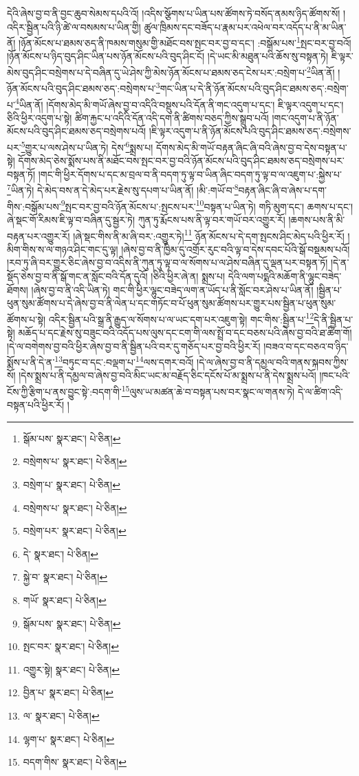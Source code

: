 དེའི་ཞེས་བྱ་བ་ནི་བྱང་ཆུབ་སེམས་དཔའི་འོ། །འདིས་སྩོགས་པ་ཡིན་པས་ཚོགས་ཏེ་བསོད་ནམས་ཉིད་ཚོགས་སོ། །འདིར་སྦྱིན་པའི་ཉི་ཚེ་ལ་བསམས་པ་ཡིན་གྱི། ཚུལ་ཁྲིམས་དང་བཟོད་པ་རྣམ་པར་འཕེལ་བར་འདོད་པ་ནི་མ་ཡིན་ནོ། །ཉོན་མོངས་པ་ཐམས་ཅད་ནི་ཁམས་གསུམ་གྱི་མཐོང་བས་སྤང་བར་བྱ་བ་དང་། :བསྒོམ་པས་\footnote{སྒོམ་པས་  སྣར་ཐང་།  པེ་ཅིན། }སྤང་བར་བྱ་བའོ། །ཉོན་མོངས་པ་ཉིད་བུད་ཤིང་ཡིན་པས་ཉོན་མོངས་པའི་བུད་ཤིང་ངོ། །དེ་ཡང་མི་མཐུན་པའི་ཆོས་སུ་བསྟན་ཏེ། ཇི་ལྟར་མེས་བུད་ཤིང་བསྲེགས་པ་དེ་བཞིན་དུ་ཡེ་ཤེས་ཀྱི་མེས་ཉོན་མོངས་པ་ཐམས་ཅད་ངེས་པར་:བསྲེག་པ་\footnote{བསྲེགས་པ་  སྣར་ཐང་།  པེ་ཅིན། }ཡིན་ནོ། །ཉོན་མོངས་པའི་བུད་ཤིང་ཐམས་ཅད་:བསྲེགས་པ་\footnote{བསྲེག་པ་  སྣར་ཐང་།  པེ་ཅིན། }གང་ཡིན་པ་དེ་ནི་ཉོན་མོངས་པའི་བུད་ཤིང་ཐམས་ཅད་:བསྲེག་པ་\footnote{བསྲེགས་པ་  སྣར་ཐང་།  པེ་ཅིན། }ཡིན་ནོ། །དོགས་མེད་མི་གཡོ་ཞེས་བྱ་བ་འདིའི་བསྡུས་པའི་དོན་ནི་གང་འདུག་པ་དང་། ཇི་ལྟར་འདུག་པ་དང་། ཅིའི་ཕྱིར་འདུག་པ་སྟེ། ཚིག་རྐྱང་པ་འདིའི་དོན་འདི་དག་ནི་ཚིགས་བཅད་ཀྱིས་སྒྲུབ་པའོ། །གང་འདུག་པ་ནི་ཉོན་མོངས་པའི་བུད་ཤིང་ཐམས་ཅད་བསྲེགས་པའོ། །ཇི་ལྟར་འདུག་པ་ནི་ཉོན་མོངས་པའི་བུད་ཤིང་ཐམས་ཅད་:བསྲེགས་པར་\footnote{བསྲེག་པར་  སྣར་ཐང་།  པེ་ཅིན། }གྱུར་པ་ལས་ཤེས་པ་ཡིན་ཏེ། དེས་\footnote{དེ་  སྣར་ཐང་།  པེ་ཅིན། }སྨྲས་པ། དོགས་མེད་མི་གཡོ་བརྟན་ཞིང་ཞི་བའི་ཞེས་བྱ་བ་དེས་བསྟན་པ་སྟེ། དོགས་མེད་ཅེས་སྨོས་པས་ནི་མཐོང་བས་སྤང་བར་བྱ་བའི་ཉོན་མོངས་པའི་བུད་ཤིང་ཐམས་ཅད་བསྲེགས་པར་བསྟན་ཏོ། །གང་གི་ཕྱིར་དོགས་པ་དང་མ་བྲལ་བ་ནི་བདག་ཏུ་ལྟ་བ་ཡིན་ཞིང་བདག་ཏུ་ལྟ་བ་ལ་འཇུག་པ་:སྐྱེས་པ་\footnote{སྐྱེ་བ་  སྣར་ཐང་།  པེ་ཅིན། }ཡིན་ཏེ། དེ་མེད་བས་ན་དེ་མེད་པར་རྗེས་སུ་དཔག་པ་ཡིན་ནོ། །མི་:གཡོ་བ་\footnote{གཡོ་  སྣར་ཐང་།  པེ་ཅིན། }བརྟན་ཞིང་ཞི་བ་ཞེས་པ་དག་གིས་:བསྒོམ་པས་\footnote{སྒོམ་པས་  སྣར་ཐང་།  པེ་ཅིན། }སྤང་བར་བྱ་བའི་ཉོན་མོངས་པ་:སྤངས་པར་\footnote{སྤང་བར་  སྣར་ཐང་།  པེ་ཅིན། }བསྟན་པ་ཡིན་ཏེ། གཏི་མུག་དང་། ཆགས་པ་དང་། ཞེ་སྡང་གོ་རིམས་ཇི་ལྟ་བ་བཞིན་དུ་སྦྱར་ཏེ། ཀུན་ཏུ་རྨོངས་པས་ནི་ལྟ་བར་གཡོ་བར་འགྱུར་རོ། །ཆགས་པས་ནི་མི་བརྟན་པར་འགྱུར་རོ། །ཞེ་སྡང་གིས་ནི་མ་ཞི་བར་:འགྱུར་ཏེ།\footnote{འགྱུར་སྟེ།  སྣར་ཐང་།  པེ་ཅིན། } ཉོན་མོངས་པ་དེ་དག་སྤངས་ཤིང་མེད་པའི་ཕྱིར་རོ། །མིག་གིས་ས་ལ་གཉའ་ཤིང་གང་དུ་ལྟ། །ཞེས་བྱ་བ་ནི་ཁྱིམ་དུ་འགྲོར་རུང་བའི་ལྟ་བ་དེས་དབང་པོའི་སྒོ་བསྡམས་པའོ། །རབ་ཏུ་ཞི་བར་གྱུར་ཅིང་ཞེས་བྱ་བ་འདིས་ནི་ཀུན་ཏུ་ལྟ་བ་ལ་སོགས་པ་ལ་ཤེས་བཞིན་དུ་ལྡན་པར་བསྟན་ཏོ། །དེ་ན་སྡོད་ཅེས་བྱ་བ་ནི་སྒོ་གང་ན་སློང་བའི་དོན་དུའོ། །ཅིའི་ཕྱིར་ཞེ་ན། སྨྲས་པ། དེའི་ལག་པདྨའི་མཆོག་ནི་ལྷུང་བཟེད་ཐོགས། །ཞེས་བྱ་བ་ནི་འདི་ཡིན་ཏེ། གང་གི་ཕྱིར་ལྷུང་བཟེད་ལག་ན་ཡོད་པ་ནི་སློང་བར་ཤེས་པ་ཡིན་ནོ། །སྦྱིན་པ་ཕུན་སུམ་ཚོགས་པ་དེ་ཞེས་བྱ་བ་ནི་ལེན་པ་དང་གཏོང་བ་པོ་ཕུན་སུམ་ཚོགས་པར་གྱུར་པས་སྦྱིན་པ་ཕུན་སུམ་ཚོགས་པ་སྟེ། འདིར་སྦྱིན་པའི་སྒྲ་ནི་རྒྱུད་ལ་སོགས་པ་ལ་ཡང་དག་པར་འཇུག་སྟེ། གང་གིས་:སྦྱིན་པ་\footnote{བྱིན་པ་  སྣར་ཐང་།  པེ་ཅིན། }དེ་ནི་སྦྱིན་པ་སྟེ། མཆོད་པ་དང་རྗེས་སུ་བཟུང་བའི་འདོད་པས་ལུས་དང་ངག་གི་ལས་སྤྲོ་བ་དང་བཅས་པའི་ཞེས་བྱ་བའི་ཐ་ཚིག་གོ། །དེ་ལ་བགེགས་བྱ་བའི་ཕྱིར་ཞེས་བྱ་བ་ནི་སྦྱིན་པའི་བར་དུ་གཅོད་པར་བྱ་བའི་ཕྱིར་རོ། །བཟའ་བ་དང་བཅའ་བ་ཉིད་སྨོས་པ་ནི་དེ་ན་\footnote{ལ་  སྣར་ཐང་།  པེ་ཅིན། }བཏུང་བ་དང་:བལྡག་པ་\footnote{ལྷག་པ་  སྣར་ཐང་།  པེ་ཅིན། }ལས་དགར་བའོ། །དེ་ལ་ཞེས་བྱ་བ་ནི་དམྱལ་བའི་གནས་སྐབས་ཀྱིས་སོ། །དེས་སྨྲས་པ་ནི་དམྱལ་བ་ཞེས་བྱ་བའི་མིང་ཡང་མ་བརྗོད་ཅིང་དངོས་པོ་མ་སྨྲས་པ་ནི་དེས་སྨྲས་པའོ། །ཁང་པའི་ངོས་ཀྱི་རྩིག་པ་ནས་བྱུང་སྟེ་:བདག་གི་\footnote{བདག་གིས་  སྣར་ཐང་།  པེ་ཅིན། }ལུས་ཡ་མཚན་ཆེ་བ་བསྟན་པས་བར་སྣང་ལ་གནས་ཏེ། དེ་ལ་ཚིག་འདི་བསྟན་པའི་ཕྱིར་རོ། །
